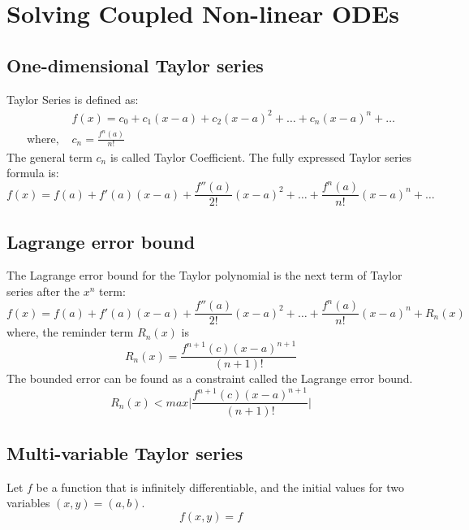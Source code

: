 \documentclass[twoside,a4paper,12pt]{article}
\theoremstyle{definition}
\begin{document}
\section{Solving Coupled Non-linear ODEs}
\subsection{One-dimensional Taylor series}
Taylor Series is defined as:
\begin{align}
& f(x)  = c_0 + c_1(x-a) + c_2(x-a)^2 + \dots + c_n(x-a)^n + \dots \\
\text{where, } & c_n  = \frac{f^n(a)}{n!} 
\end{align}
The general term $c_n$ is called Taylor Coefficient. The fully expressed Taylor series formula is:
\begin{equation}
	f(x) = f(a) + f'(a)(x-a) + \frac{f''(a)}{2!}(x-a)^2 + \dots + \frac{f^n(a)}{n!}(x-a)^n + \dots
\end{equation}
\subsection{Lagrange error bound}
The Lagrange error bound for the Taylor polynomial is the next term of Taylor series after the $x^n$ term:
\begin{equation}
	f(x) = f(a) + f'(a)(x-a) + \frac{f''(a)}{2!}(x-a)^2 + \dots + \frac{f^n(a)}{n!}(x-a)^n + R_n(x)
\end{equation}
where, the reminder term $R_n(x)$ is
\begin{equation}
	R_n(x) = \frac{f^{n+1}(c)(x-a)^{n+1}}{(n+1)!}
\end{equation}
The bounded error can be found as a constraint called the Lagrange error bound.
\begin{equation}
	R_n(x) < max \bigg| \frac{f^{n+1}(c)(x-a)^{n+1}}{(n+1)!} \bigg|
\end{equation}

\subsection{Multi-variable Taylor series}
Let $f$ be a function that is infinitely differentiable, and the initial values for two variables $(x,y) = (a,b)$.
\begin{equation}
	f(x,y) = f
\end{equation}
\end{document}
